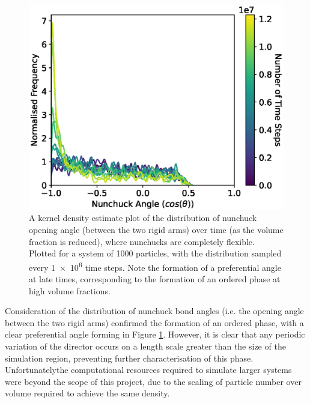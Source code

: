 \documentclass[11pt, a4paper]{article} %
\providecommand{\DIFadd}[1]{{\protect\color{blue}\uwave{#1}}} %
\providecommand{\DIFaddbegin}{} %
\providecommand{\DIFaddend}{} %
\begin{document}
\begin{figure} [h!]
	\centering
	\includegraphics[width=0.7\linewidth]{Figures/nun_fr_angledist}
	\caption{A kernel density estimate plot of the distribution of nunchuck opening angle (between the two rigid arms) over time (as the volume fraction is reduced), where nunchucks are completely flexible. Plotted for a system of \num{1000} particles, with the distribution sampled every \num{1e6} time steps. Note the formation of a preferential angle at late times, corresponding to the formation of an ordered phase at high volume fractions.}
	\label{fig:nun_fr_angledist}
\end{figure}  %

Consideration of the distribution of nunchuck bond angles (i.e. the opening angle between the two rigid arms) confirmed the formation of an ordered phase, with a clear preferential angle forming in Figure \ref{fig:nun_fr_angledist}. However, it is clear that any periodic variation of the director occurs on a length scale greater than the size of the simulation region, preventing further characterisation of this phase. Unfortunately\DIFaddbegin \DIFadd{, }\DIFaddend the computational resources required to simulate larger systems were beyond the scope of this project, due to the scaling of particle number over volume required to achieve the same density. 
\end{document}
